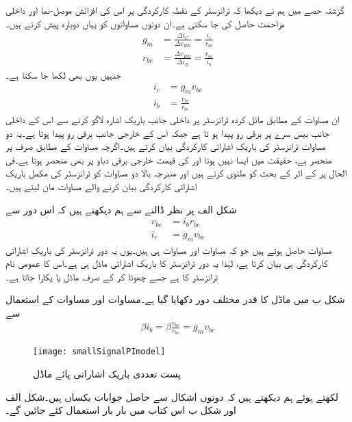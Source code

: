 گزشتہ حصے میں ہم نے دیکھا کہ ٹرانزسٹر کے نقطہ کارکردگی پر اس کی افزائش موصل-نما   اور داخلی مزاحمت   حاصل کی جا سکتی ہے۔ان دونوں مساواتوں کو یہاں دوبارہ پیش کرتے ہیں۔
\begin{align}
g_m &=\frac{\Delta i_C}{\Delta v_{BE}}=\frac{i_c}{v_{be}}\\
r_{be}&=\frac{\Delta v_{BE}}{\Delta i_B}=\frac{v_{be}}{i_b}
\end{align}
جنہیں یوں بھی لکھا جا سکتا ہے۔
\begin{align}
i_c &= g_m v_{be} \label{مساوات_ٹرانزسٹر_باریک_اشارات_کلکٹر _رو} \\
i_b&=\frac{v_{be}}{r_{be}} \label{مساوات_ٹرانزسٹر_باریک_اشارات_قابو_رو}
\end{align}
ان مساوات کے مطابق مائل کردہ ٹرانزسٹر پر داخلی جانب باریک اشارہ  لاگو کرنے سے اس کے داخلی جانب  بیس سرے پر برقی رو  پیدا ہو تا ہے جبکہ اس کے خارجی جانب برقی رو  پیدا ہوتا ہے۔یہ دو مساوات ٹرانزسٹر کی باریک اشاراتی کارکردگی بیان کرتے ہیں۔اگرچہ مساوات   کے مطابق  صرف  پر منحصر ہے، حقیقت میں ایسا نہیں ہوتا اور   کی قیمت خارجی برقی دباو  پر بھی منحصر ہوتا ہے۔فی الحال  پر  کے اثر کے بحث کو ملتوی کرتے ہیں اور مندرجہ بالا دو مساوات کو ٹرانزسٹر کی مکمل باریک اشاراتی کارکردگی بیان کرنے والے مساوات مان لیتے ہیں۔

شکل  الف پر نظر ڈالنے سے ہم دیکھتے ہیں کہ  اس دور سے 
\begin{align*}
v_{be}&=i_b r_{be}\\
i_c &=g_m v_{be}
\end{align*}
مساوات حاصل ہوتے ہیں جو کہ مساوات   اور مساوات   ہی ہیں۔یوں یہ دور ٹرانزسٹر کی باریک اشاراتی کارکردگی ہی بیان کرتا ہے، لہٰذا یہ دور ٹرانزسٹر کا باریک اشاراتی ماڈل ہی ہے۔اس کا عمومی نام ٹرانزسٹر کا     ہے جسے چھوٹا کر کے صرف   ماڈل یا  پکارا جاتا ہے۔

شکل  ب میں  ماڈل کا قدر مختلف دور دکھایا گیا ہے۔مساوات   اور مساوات   کے استعمال سے
\begin{align*}
\beta i_b = \beta \frac{v_{be}}{r_{be}}=g_m v_{be}
\end{align*}
%
\begin{figure}
\centering
\texttt{[image: smallSignalPImodel]}
\caption{پست تعددی باریک اشاراتی پائے ماڈل}
\label{شکل_باریک_اشاراتی_پائے_ماڈل}
\end{figure}
لکھتے ہوئے ہم دیکھتے ہیں کہ دونوں اشکال سے حاصل جوابات یکساں ہیں۔شکل  الف اور شکل  ب اس کتاب میں بار بار استعمال کئے جائیں گے۔

